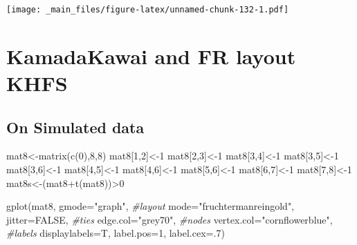 \documentclass[
  notitlepage,
  onecolumn,
  openany]{book}
\newenvironment{Shaded}{\begin{snugshade}}{\end{snugshade}}
\newcommand{\AttributeTok}[1]{\textcolor[rgb]{0.77,0.63,0.00}{#1}}
\newcommand{\CommentTok}[1]{\textcolor[rgb]{0.56,0.35,0.01}{\textit{#1}}}
\newcommand{\ConstantTok}[1]{\textcolor[rgb]{0.00,0.00,0.00}{#1}}
\newcommand{\DecValTok}[1]{\textcolor[rgb]{0.00,0.00,0.81}{#1}}
\newcommand{\FunctionTok}[1]{\textcolor[rgb]{0.00,0.00,0.00}{#1}}
\newcommand{\NormalTok}[1]{#1}
\newcommand{\OtherTok}[1]{\textcolor[rgb]{0.56,0.35,0.01}{#1}}
\newcommand{\SpecialCharTok}[1]{\textcolor[rgb]{0.00,0.00,0.00}{#1}}
\newcommand{\StringTok}[1]{\textcolor[rgb]{0.31,0.60,0.02}{#1}}
\begin{document}
\texttt{[image: \_main\_files/figure-latex/unnamed-chunk-132-1.pdf]}

\hypertarget{kamadakawai-and-fr-layout-khfs}{%
\section{KamadaKawai and FR layout KHFS}\label{kamadakawai-and-fr-layout-khfs}}

\hypertarget{on-simulated-data}{%
\subsection{On Simulated data}\label{on-simulated-data}}

\begin{Shaded}
\begin{Highlighting}[]
\NormalTok{mat8}\OtherTok{\textless{}{-}}\FunctionTok{matrix}\NormalTok{(}\FunctionTok{c}\NormalTok{(}\DecValTok{0}\NormalTok{),}\DecValTok{8}\NormalTok{,}\DecValTok{8}\NormalTok{)}
\NormalTok{mat8[}\DecValTok{1}\NormalTok{,}\DecValTok{2}\NormalTok{]}\OtherTok{\textless{}{-}}\DecValTok{1}
\NormalTok{mat8[}\DecValTok{2}\NormalTok{,}\DecValTok{3}\NormalTok{]}\OtherTok{\textless{}{-}}\DecValTok{1}
\NormalTok{mat8[}\DecValTok{3}\NormalTok{,}\DecValTok{4}\NormalTok{]}\OtherTok{\textless{}{-}}\DecValTok{1}
\NormalTok{mat8[}\DecValTok{3}\NormalTok{,}\DecValTok{5}\NormalTok{]}\OtherTok{\textless{}{-}}\DecValTok{1}
\NormalTok{mat8[}\DecValTok{3}\NormalTok{,}\DecValTok{6}\NormalTok{]}\OtherTok{\textless{}{-}}\DecValTok{1}
\NormalTok{mat8[}\DecValTok{4}\NormalTok{,}\DecValTok{5}\NormalTok{]}\OtherTok{\textless{}{-}}\DecValTok{1}
\NormalTok{mat8[}\DecValTok{4}\NormalTok{,}\DecValTok{6}\NormalTok{]}\OtherTok{\textless{}{-}}\DecValTok{1}
\NormalTok{mat8[}\DecValTok{5}\NormalTok{,}\DecValTok{6}\NormalTok{]}\OtherTok{\textless{}{-}}\DecValTok{1}
\NormalTok{mat8[}\DecValTok{6}\NormalTok{,}\DecValTok{7}\NormalTok{]}\OtherTok{\textless{}{-}}\DecValTok{1}
\NormalTok{mat8[}\DecValTok{7}\NormalTok{,}\DecValTok{8}\NormalTok{]}\OtherTok{\textless{}{-}}\DecValTok{1}
\NormalTok{mat8s}\OtherTok{\textless{}{-}}\NormalTok{(mat8}\SpecialCharTok{+}\FunctionTok{t}\NormalTok{(mat8))}\SpecialCharTok{\textgreater{}}\DecValTok{0}

\FunctionTok{gplot}\NormalTok{(mat8, }
      \AttributeTok{gmode=}\StringTok{"graph"}\NormalTok{,}
      \CommentTok{\#layout}
      \AttributeTok{mode=}\StringTok{"fruchtermanreingold"}\NormalTok{,}
      \AttributeTok{jitter=}\ConstantTok{FALSE}\NormalTok{,}
      \CommentTok{\#ties}
      \AttributeTok{edge.col=}\StringTok{"grey70"}\NormalTok{,}
      \CommentTok{\#nodes}
      \AttributeTok{vertex.col=}\StringTok{"cornflowerblue"}\NormalTok{,}
      \CommentTok{\#labels}
      \AttributeTok{displaylabels=}\NormalTok{T,}
      \AttributeTok{label.pos=}\DecValTok{1}\NormalTok{,}
      \AttributeTok{label.cex=}\NormalTok{.}\DecValTok{7}\NormalTok{)}
\end{Highlighting}
\end{Shaded}
\end{document}
